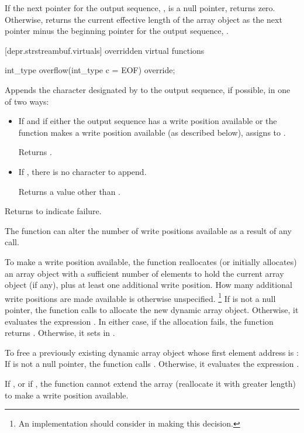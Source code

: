 \begin{itemdescr}
\pnum
\effects
If the next pointer for the output sequence, , is
a null pointer, returns zero.
Otherwise, returns the current
effective length of the array object as the next pointer minus the beginning
pointer for the output sequence, .
\end{itemdescr}

[depr.strstreambuf.virtuals]{ overridden virtual functions}

%
\begin{itemdecl}
int_type overflow(int_type c = EOF) override;
\end{itemdecl}

\begin{itemdescr}
\pnum
\effects
Appends the character designated by  to the output
sequence, if possible, in one of two ways:
\begin{itemize}
\item
If
and if either the output sequence has a write position available or
the function makes a write position available
(as described below),
assigns  to
.

Returns
.

\item
If
,
there is no character to append.

Returns a value other than .
\end{itemize}

\pnum
Returns
to indicate failure.

\pnum
\remarks
The function can alter the number of write positions available as a
result of any call.

\pnum
To make a write position available, the function reallocates
(or initially allocates)
an array object with a sufficient number of elements
 to hold the current array object (if any),
plus at least one additional write position.
How many additional write positions are made
available is otherwise unspecified.%
%
\footnote{An implementation should consider  in making this
decision.}
If  is not a null pointer, the function calls
to allocate the new dynamic array object.
Otherwise, it evaluates the expression
.
In either case, if the allocation fails, the function returns
.
Otherwise, it sets  in .

\pnum
To free a previously existing dynamic array object whose first
element address is :
If  is not a null pointer,
the function calls
.
Otherwise, it evaluates the expression .

\pnum
If
,
or if
,
the function cannot extend the array (reallocate it with greater length) to make a write position available.
\end{itemdescr}

